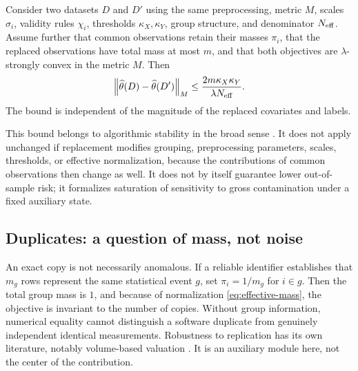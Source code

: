 \begin{corollary}
Consider two datasets $D$ and $D'$ using the same preprocessing, metric $M$, scales $\sigma_i$, validity rules $\chi_i$, thresholds $\kappa_X,\kappa_Y$, group structure, and denominator $N_{\rm eff}$. Assume further that common observations retain their masses $\pi_i$, that the replaced observations have total mass at most $m$, and that both objectives are $\lambda$-strongly convex in the metric $M$. Then
\begin{equation}
\left\lVert \widehat\theta(D)-\widehat\theta(D')\right\rVert_M
\leq
\frac{2m\kappa_X\kappa_Y}{\lambda N_{\rm eff}}.
\label{eq:replacement-stability}
\end{equation}
The bound is independent of the magnitude of the replaced covariates and labels.
\end{corollary}

This bound belongs to algorithmic stability in the broad sense \citep{bousquet2002}. It does not apply unchanged if replacement modifies grouping, preprocessing parameters, scales, thresholds, or effective normalization, because the contributions of common observations then change as well. It does not by itself guarantee lower out-of-sample risk; it formalizes saturation of sensitivity to gross contamination under a fixed auxiliary state.

\subsection{Duplicates: a question of mass, not noise}
An exact copy is not necessarily anomalous. If a reliable identifier establishes that $m_g$ rows represent the same statistical event $g$, set $\pi_i=1/m_g$ for $i\in g$. Then the total group mass is $1$, and because of normalization \eqref{eq:effective-mass}, the objective is invariant to the number of copies. Without group information, numerical equality cannot distinguish a software duplicate from genuinely independent identical measurements. Robustness to replication has its own literature, notably volume-based valuation \citep{xu2021volume}. It is an auxiliary module here, not the center of the contribution.

